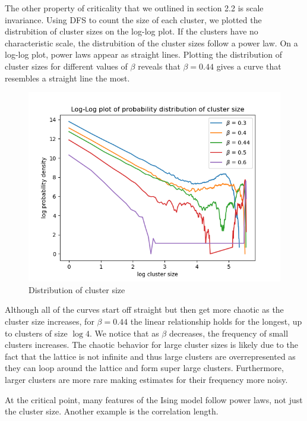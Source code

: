 \documentclass{article}
\begin{document}
The other property of criticality that we outlined in section 2.2 is scale invariance. 
Using DFS to count the size of each cluster, we plotted the distrubition of cluster sizes on the log-log plot. 
If the clusters have no characteristic scale, the distrubition of the cluster sizes follow a power law. 
On a log-log plot, power laws appear as straight lines. Plotting the distribution of cluster sizes for different
values of $\beta$ reveals that $\beta = 0.44$ gives a curve that resembles a straight line the most.

\begin{figure}[ht]
    \includegraphics[width=\columnwidth]{plots/cluster_size.png}
    \caption{Distribution of cluster size}
    \label{fig:6}
\end{figure}

Although all of the curves start off straight but then get more chaotic as the cluster size increases, for $\beta = 0.44$
the linear relationship holds for the longest, up to clusters of size $\log 4$. We notice that as $\beta$ decreases, 
the frequency of small clusters increases. The chaotic behavior for large cluster sizes is likely due to the fact that the lattice
is not infinite and thus large clusters are overrepresented as they can loop around the lattice and form super large clusters. 
Furthermore, larger clusters are more rare making estimates for their frequency more noisy. 

At the critical point, many features of the Ising model follow power laws, not just the cluster size. Another example is
the correlation length. 
\end{document}

